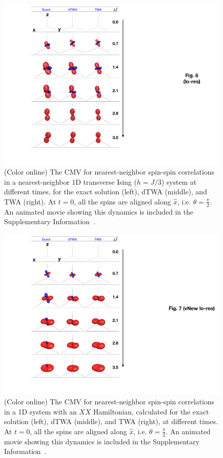 \documentclass[pra,reprint,superscriptaddress]{revtex4-1}
\begin{document}
\begin{figure}[t]\centering
 \includegraphics[width = \columnwidth]{fig6small.pdf}
 \caption{(Color online) The CMV for nearest-neighbor spin-spin correlations in a nearest-neighbor 1D transverse Ising ($h=J/3$) system at different times, for the exact solution (left), dTWA (middle), and TWA (right). At $t=0$, all the spins are aligned along $\hat x$, i.e. $\theta = \frac{\pi}{2}$. An animated movie showing this dynamics is included in the Supplementary Information~\cite{supplement}.}
 \label{fig: transIsing}
\end{figure}
\begin{figure}[t]\centering
 \includegraphics[width = \columnwidth]{fig7small.pdf}
 \caption{(Color online) The CMV for nearest-neighbor spin-spin correlations in a 1D system with an $XX$ Hamiltonian, calculated for the exact solution (left), dTWA (middle), and TWA (right), at different times. At $t=0$, all the spins are aligned along $\hat x$, i.e. $\theta = \frac{\pi}{2}$. An animated movie showing this dynamics is included in the Supplementary Information~\cite{supplement}.}
 \label{fig: XX}
\end{figure}
\end{document}
